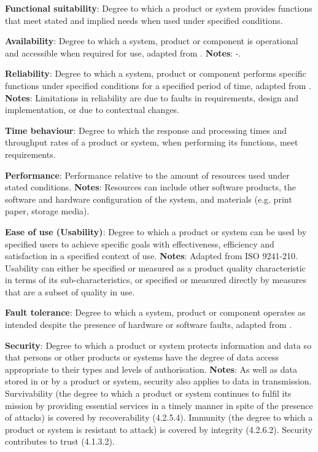 \textbf{Functional suitability}: Degree to which a product or system provides functions that meet stated and implied needs when used under specified conditions.

\textbf{Availability}: Degree to which a system, product or component is operational and accessible when required for use, adapted from \cite{iso_central_secretary_isoiecieee_2010}. \textbf{Notes}: -.

\textbf{Reliability}: Degree to which a system, product or component performs specific functions under specified conditions for a specified period of time, adapted from \cite{iso_central_secretary_isoiecieee_2010}. \textbf{Notes}: Limitations in reliability are due to faults in requirements, design and implementation, or due to contextual changes.

\textbf{Time behaviour}: Degree to which the response and processing times and throughput rates of a product or system, when performing its functions, meet requirements.

\textbf{Performance}: Performance relative to the amount of resources used under stated conditions. \textbf{Notes}: Resources can include other software products, the software and hardware configuration of the system, and materials (e.g. print paper, storage media).

\textbf{Ease of use (Usability)}: Degree to which a product or system can be used by specified users to achieve specific goals with effectiveness, efficiency and satisfaction in a specified context of use. \textbf{Notes}: Adapted from ISO 9241-210. Usability can either be specified or measured as a product quality characteristic in terms of its sub-characteristics, or specified or measured directly by measures that are a subset of quality in use.

\textbf{Fault tolerance}: Degree to which a system, product or component operates as intended despite the presence of hardware or software faults, adapted from \cite{iso_central_secretary_isoiecieee_2010}.

\textbf{Security}: Degree to which a product or system protects information and data so that persons or other products or systems have the degree of data access appropriate to their types and levels of authorisation. \textbf{Notes}: As well as data stored in or by a product or system, security also applies to data in transmission. Survivability (the degree to which a product or system continues to fulfil its mission by providing essential services in a timely manner in spite of the presence of attacks) is covered by recoverability (4.2.5.4). Immunity (the degree to which a product or system is resistant to attack) is covered by integrity (4.2.6.2). Security contributes to trust (4.1.3.2).

